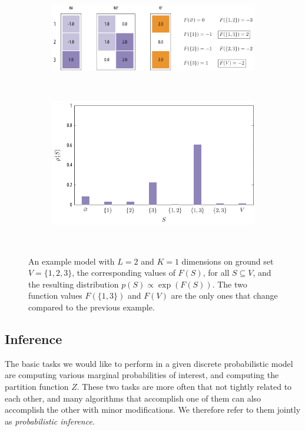 \begin{example}[\fldc{}]
\renewcommand{\subflen}{\textwidth}
\begin{figure}[htbp]
  \centering
  \begin{subfigure}[b]{\subflen}
    \centering
    \includegraphics[width=\textwidth]{figures/background/fldc.pdf}
  \end{subfigure}\\[1.5em]
  \begin{subfigure}[b]{\subflen}
    \centering
    \hspace{-2.65em}\includegraphics[width=1.07\textwidth]{figures/background/fldc_dist.pdf}
  \end{subfigure}\\[1em]
  \caption{An example \fldc{} model with $L = 2$ and $K = 1$ dimensions on ground set $V = \{1, 2, 3\}$, the corresponding values of $F(S)$, for all $S \subseteq V$, and the resulting distribution $p(S) \propto \exp(F(S))$.
  The two function values $F(\{1, 3\})$ and $F(V)$ are the only ones that change compared to the previous \flid{} example.
  }
  \label{fig:fldc}
\end{figure}
\end{example}


\subsection{Inference}
The basic tasks we would like to perform in a given discrete probabilistic model are computing various marginal probabilities of interest, and computing the partition function $Z$.
These two tasks are more often that not tightly related to each other, and many algorithms that accomplish one of them can also accomplish the other with minor modifications.
We therefore refer to them jointly as \emph{probabilistic inference}.

